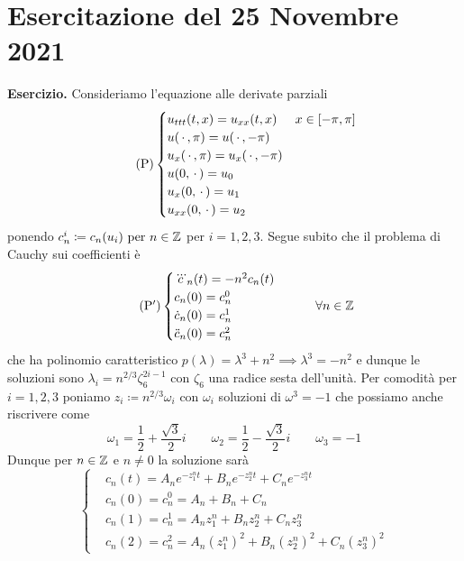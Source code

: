 %
%

\section{Esercitazione del 25 Novembre 2021}

\textbf{Esercizio.}
Consideriamo l'equazione alle derivate parziali
\begin{equation}
	\tag{P}
	\begin{cases}
		u_{ttt}(t, x) = u_{xx}(t, x) & x \in [-\pi, \pi] \\
		u(\,\cdot\,, \pi) = u(\,\cdot\,, -\pi) \\
		u_x(\,\cdot\,, \pi) = u_x(\,\cdot\,, -\pi) \\
		u(0, \,\cdot\,) = u_0 \\
		u_{x}(0, \,\cdot\,) = u_1 \\
		u_{xx}(0, \,\cdot\,) = u_2 \\
	\end{cases}
\end{equation}
ponendo $c_n^i \coloneqq c_n(u_i) \text{ per } n \in \mathbb Z$ per $i = 1, 2, 3$. Segue subito che il problema di Cauchy sui coefficienti è
\begin{equation}
	\tag{P$'$}
	\begin{cases}
		\dddot c_n(t) = -n^2c_n(t) \\
		c_n(0) = c_n^0 \\
		\dot c_n(0) = c_n^1 \\
		\ddot c_n(0) = c_n^2 \\
	\end{cases}
	\qquad
	\forall n \in \mathbb Z
\end{equation}
che ha polinomio caratteristico $p(\lambda) = \lambda^3 + n^2 \implies \lambda^3 = -n^2$ e dunque le soluzioni sono $\lambda_i = n^{2/3} \zeta_6^{2i - 1}$ con $\zeta_6$ una radice sesta dell'unità. Per comodità per $i = 1, 2, 3$ poniamo $z_i \coloneqq n^{2/3} \omega_i$ con $\omega_i$ soluzioni di $\omega^3 = -1$ che possiamo anche riscrivere come
$$
\omega_1 = \frac{1}{2} + \frac{\sqrt 3}{2}i
\qquad
\omega_2 = \frac{1}{2} - \frac{\sqrt 3}{2}i
\qquad
\omega_3 = -1
$$
Dunque per $n \in \mathbb Z$ e $n \neq 0$ la soluzione sarà
$$
\left\{
\begin{aligned}
	& c_n(t) = A_n e^{-z_1^n t} + B_n e^{-z_2^n t} + C_n e^{-z_3^n t} \\[1ex]
	& c_n(0) = c_n^0 = A_n + B_n + C_n \\[1ex]
	& c_n(1) = c_n^1 = A_n z_1^n + B_n z_2^n + C_n z_3^n \\[1ex]
	& c_n(2) = c_n^2 = A_n (z_1^n)^2 + B_n (z_2^n)^2 + C_n (z_3^n)^2
\end{aligned}
\right.
$$
